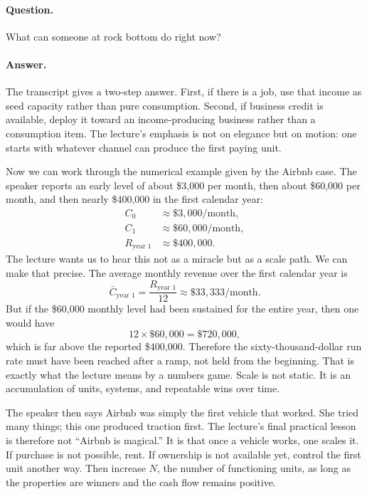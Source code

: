 \paragraph{Question.} What can someone at rock bottom do right now?

\paragraph{Answer.} The transcript gives a two-step answer. First, if there is a job, use that income as seed capacity rather than pure consumption. Second, if business credit is available, deploy it toward an income-producing business rather than a consumption item. The lecture's emphasis is not on elegance but on motion: one starts with whatever channel can produce the first paying unit.

Now we can work through the numerical example given by the Airbnb case. The speaker reports an early level of about \$3{,}000 per month, then about \$60{,}000 per month, and then nearly \$400{,}000 in the first calendar year:
\begin{align}
C_0 &\approx \$3{,}000/\text{month},\\
C_1 &\approx \$60{,}000/\text{month},\\
R_{\text{year 1}} &\approx \$400{,}000.
\end{align}
The lecture wants us to hear this not as a miracle but as a scale path. We can make that precise. The average monthly revenue over the first calendar year is
\begin{equation}
\bar C_{\text{year 1}} = \frac{R_{\text{year 1}}}{12} \approx \$33{,}333/\text{month}.
\end{equation}
But if the \$60{,}000 monthly level had been sustained for the entire year, then one would have
\begin{equation}
12\times \$60{,}000 = \$720{,}000,
\end{equation}
which is far above the reported \$400{,}000. Therefore the sixty-thousand-dollar run rate must have been reached after a ramp, not held from the beginning. That is exactly what the lecture means by a numbers game. Scale is not static. It is an accumulation of units, systems, and repeatable wins over time.

The speaker then says Airbnb was simply the first vehicle that worked. She tried many things; this one produced traction first. The lecture's final practical lesson is therefore not ``Airbnb is magical.'' It is that once a vehicle works, one scales it. If purchase is not possible, rent. If ownership is not available yet, control the first unit another way. Then increase \(N\), the number of functioning units, as long as the properties are winners and the cash flow remains positive.

